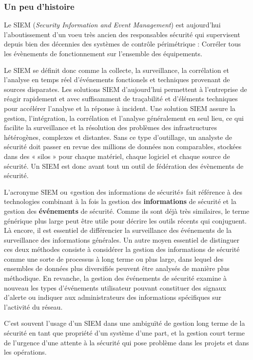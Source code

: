 \subsubsection{Un peu d'histoire}

Le SIEM (\textit{Security Information and Event Management})  est aujourd'hui l'aboutissement d'un voeu  très ancien des responsables sécurité qui supervisent depuis bien des décennies des systèmes de contrôle périmétrique : Corréler tous les évènements de fonctionnement sur l'ensemble des équipements. 

Le SIEM se définit donc comme la collecte, la surveillance, la corrélation et l’analyse en temps réel d'événements fonctionels et techniques provenant de sources disparates. Les solutions SIEM d’aujourd’hui permettent à l'entreprise de réagir rapidement et avec suffisamment de traçabilité et d'éléments techniques pour  accélérer l'analyse et la réponse à incident.
Une solution SIEM assure la gestion, l’intégration, la corrélation et l’analyse généralement en seul lieu, ce qui facilite la surveillance et la résolution des problèmes des infrastructures hétérogènes, complexes et distantes. Sans ce type d'outillage, un analyste de sécurité doit passer en revue des millions de données non comparables, stockées dans des « silos » pour chaque matériel, chaque logiciel et chaque source de sécurité. Un SIEM est donc avant tout un outil de fédération des évènements de sécurité.

L'acronyme SIEM ou «gestion des informations de sécurité» fait référence à des technologies combinant à la fois la gestion des \textbf{informations} de sécurité et la gestion des \textbf{événements} de sécurité. Comme ils sont déjà très similaires, le terme générique plus large peut être utile pour décrire les outils récents  qui conjuguent. Là encore, il est essentiel de différencier la surveillance des événements de la surveillance des informations générales. Un autre moyen essentiel de distinguer ces deux méthodes consiste à considérer la gestion des informations de sécurité comme une sorte de processus à long terme ou plus large, dans lequel des ensembles de données plus diversifiés peuvent être analysés de manière plus méthodique. En revanche, la gestion des événements de sécurité examine à nouveau les types d’événements utilisateur pouvant constituer des signaux d’alerte ou indiquer aux administrateurs des informations spécifiques sur l’activité du réseau.

C'est souvent l'usage d'un SIEM dans une ambiguïté de gestion long terme de la sécurité en tant que propriété d'un système d'une part, et la gestion court terme de l'urgence d'une attente à la sécurité qui pose problème dans les projets et dans les opérations.
 
